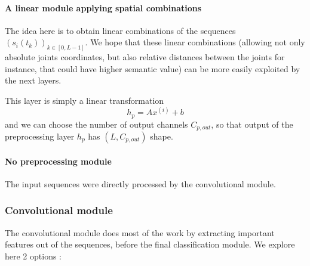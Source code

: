 \documentclass{article}
\begin{document}
\paragraph{A linear module applying spatial combinations}
The idea here is to obtain linear combinations of the sequences $(s_i(t_k))_{k \in [0,L-1]}$. We hope that these linear combinations (allowing not only absolute joints coordinates, but also relative distances between the joints for instance, that could have higher semantic value) can be more easily exploited by the next layers.
\par
This layer is simply a linear transformation
$$h_p = A x^{(i)} + b$$
and we can choose the number of output channels $C_{p,out}$, so that output of the preprocessing layer $h_p$ has $(L, C_{p,out})$ shape.

\paragraph{No preprocessing module}
The input sequences were directly processed by the convolutional module.

\subsubsection{Convolutional module} \label{section:convolutional-module}
The convolutional module does most of the work by extracting important features out of the sequences, before the final classification module. We explore here 2 options :
\end{document}
